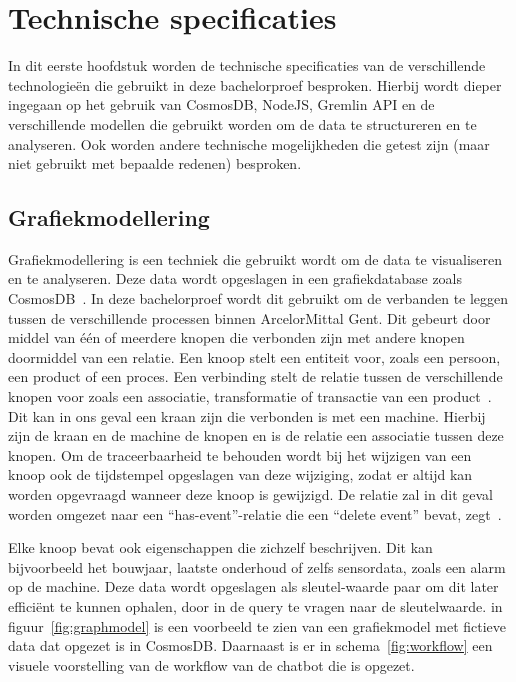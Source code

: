 
\section{Technische specificaties}
In dit eerste hoofdstuk worden de technische specificaties van de verschillende technologieën die gebruikt in deze bachelorproef besproken.
Hierbij wordt dieper ingegaan op het gebruik van CosmosDB, NodeJS, Gremlin API en de verschillende modellen die gebruikt worden om de data te structureren en te analyseren.
Ook worden andere technische mogelijkheden die getest zijn (maar niet gebruikt met bepaalde redenen) besproken.

\subsection{Grafiekmodellering}
Grafiekmodellering is een techniek die gebruikt wordt om de data te visualiseren en te analyseren. Deze data wordt opgeslagen in een grafiekdatabase zoals CosmosDB~\autocite{neo4j20252}. 
In deze bachelorproef wordt dit gebruikt om de verbanden te leggen tussen de verschillende processen binnen ArcelorMittal Gent.
Dit gebeurt door middel van één of meerdere knopen die verbonden zijn met andere knopen doormiddel van een relatie.
Een knoop stelt een entiteit voor, zoals een persoon, een product of een proces. Een verbinding stelt de relatie tussen de verschillende knopen voor zoals een associatie, transformatie of transactie van een product~\autocite{Byun2020}.
Dit kan in ons geval een kraan zijn die verbonden is met een machine. Hierbij zijn de kraan en de machine de knopen en is de relatie een associatie tussen deze knopen.
Om de traceerbaarheid te behouden wordt bij het wijzigen van een knoop ook de tijdstempel opgeslagen van deze wijziging, zodat er altijd kan worden opgevraagd wanneer deze knoop is gewijzigd.
De relatie zal in dit geval worden omgezet naar een ``has-event''-relatie die een ``delete event'' bevat, zegt~\autocite{Byun2020}.

Elke knoop bevat ook eigenschappen die zichzelf beschrijven. Dit kan bijvoorbeeld het bouwjaar, laatste onderhoud of zelfs sensordata, zoals een alarm op de machine.
Deze data wordt opgeslagen als sleutel-waarde paar om dit later efficiënt te kunnen ophalen, door in de query te vragen naar de sleutelwaarde.
in figuur~\ref{fig:graphmodel} is een voorbeeld te zien van een grafiekmodel met fictieve data dat opgezet is in CosmosDB.\@
Daarnaast is er in schema~\ref{fig:workflow} een visuele voorstelling van de workflow van de chatbot die is opgezet.

